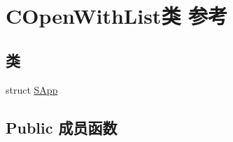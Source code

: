 \hypertarget{class_c_open_with_list}{}\section{C\+Open\+With\+List类 参考}
\label{class_c_open_with_list}
\subsection*{类}
\begin{DoxyCompactItemize}
\item 
struct \hyperlink{struct_c_open_with_list_1_1_s_app}{S\+App}
\end{DoxyCompactItemize}
\subsection*{Public 成员函数}
